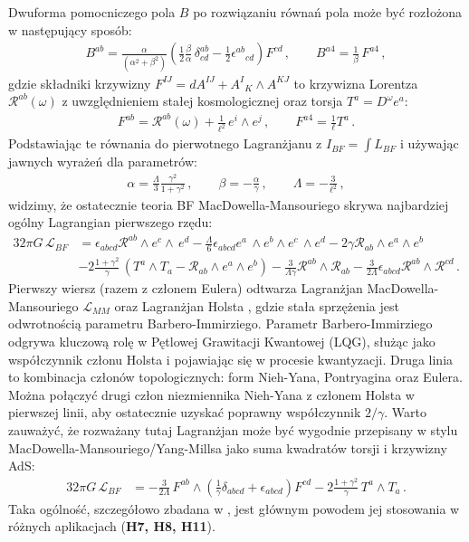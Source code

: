 \documentclass[12pt,a4paper]{article}
\begin{document}
Dwuforma pomocniczego pola $B$ po rozwiązaniu równań pola może być rozłożona w następujący sposób:
\begin{align}
	B^{ab}= \frac{\alpha}{(\alpha^{2}+\beta^{2})}\left(\frac{1}{2}\frac{\beta}{\alpha}\,\delta^{ab}_{cd}- \frac{1}{2}\epsilon^{ab}{}_{cd}\right)F^{cd}\,,\qquad 	
	B^{a4} =  \frac{1}{\beta}\,F^{a4}\,,
\end{align}
gdzie składniki krzywizny $F^{IJ}=d A^{IJ}+A^{I}{}_{K}\wedge A^{KJ}$ to krzywizna Lorentza $\mathcal{R}^{ab}(\omega)$ z uwzględnieniem stałej kosmologicznej oraz torsja $T^a=D^\omega e^a$:
\begin{align}
	F^{ab}=\mathcal{R}^{ab}(\omega )+\frac{1}{\ell ^{2}}\,e^{i}\wedge e^{j}\,,\qquad	
	F^{a4}=\frac{1}{\ell }T^{a}\,.
\end{align}
Podstawiając te równania do pierwotnego Lagranżjanu z $I_{BF}=\int L_{BF}$ i używając jawnych wyrażeń dla parametrów:
\begin{align}\label{constant}
	\alpha= \frac{ \Lambda}{3}\frac{\gamma^2}{1+{\gamma^2}}\,,\qquad {\beta}=-\frac{\alpha}\gamma\,,\qquad \Lambda=- \frac{3}{\ell^2} \,,
\end{align}
widzimy, że ostatecznie teoria BF MacDowella-Mansouriego \cite{Durka:2012wd, Freidel:2005ak} skrywa najbardziej ogólny Lagrangian pierwszego rzędu:
\begin{align*}\label{full_action}
	32\pi G\,\mathcal{L}_{BF}& = \epsilon_{abcd}\mathcal{R}^{ab}\wedge e^{c}\wedge \,e^{d}-\frac{\Lambda}{6}\epsilon_{abcd} e^{a}\,\wedge e^{b}\wedge e^{c}\,\wedge
	e^{d}  -{2}{\gamma }\mathcal{R}_{ab}\wedge e^{a}\wedge e^{b} \nonumber \\
	& -2 \frac{1+\gamma^2}{\gamma }\,\left(T^{a}\wedge T_{a}-\mathcal{R}_{ab}\wedge e^{a}\wedge
	e^{b}\right) -\frac{3}{\Lambda\gamma}\mathcal{R}^{ab}\wedge \mathcal{R}_{ab}-\frac{3}{2\Lambda}\epsilon_{abcd}\mathcal{R}^{ab}\wedge \mathcal{R}^{cd}\,.
\end{align*}
Pierwszy wiersz (razem z członem Eulera) odtwarza Lagranżjan MacDowella-Mansouriego $\mathcal{L}_{MM}$ oraz Lagranżjan Holsta \cite{Holst:1995pc}, gdzie stała sprzężenia jest odwrotnością parametru Barbero-Immirziego. Parametr Barbero-Immirziego odgrywa kluczową rolę w Pętlowej Grawitacji Kwantowej (LQG), służąc jako współczynnik członu Holsta \cite{Holst:1995pc} i pojawiając się w procesie kwantyzacji. Druga linia to kombinacja członów topologicznych: form Nieh-Yana, Pontryagina oraz Eulera. Można połączyć drugi człon niezmiennika Nieh-Yana z członem Holsta w pierwszej linii, aby ostatecznie uzyskać poprawny współczynnik $2/\gamma$. Warto zauważyć, że rozważany tutaj Lagranżjan może być wygodnie przepisany w stylu MacDowella-Mansouriego/Yang-Millsa jako suma kwadratów torsji i krzywizny AdS:
\begin{align}
	32\pi G\,\mathcal{L}_{BF}
	&=-\frac{3}{2\Lambda}\,F^{ab}\wedge\left(\frac{1}{\gamma}\delta_{abcd}+\epsilon_{abcd}\right)F^{cd}-2 \frac{1+\gamma^2}{\gamma }\,T^{a}\wedge T_{a}\,.
\end{align}
Taka ogólność, szczegółowo zbadana w \cite{Durka:2012wd}, jest głównym powodem jej stosowania w różnych aplikacjach (\textbf{H7, H8, H11}).
\end{document}
